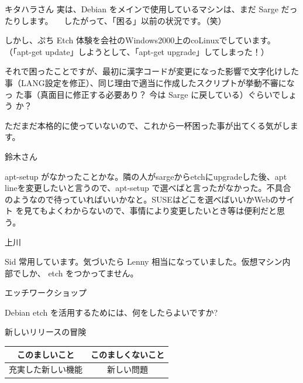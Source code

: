 \documentclass[cjk,dvipdfmx,12pt]{beamer}
\begin{document}
\begin{frame}{キタハラさん}
実は、Debian をメインで使用しているマシンは、まだ Sarge だったりします。
　したがって、「困る」以前の状況です。（笑）

しかし、ぷち Etch 体験を会社のWindows2000上のcoLinuxでしています。
（「apt-get update」しようとして、「apt-get upgrade」してしまった！）

それで困ったことですが、最初に漢字コードが変更になった影響で文字化けした
事（LANG設定を修正）、同じ理由で適当に作成したスクリプトが挙動不審になっ
た事（真面目に修正する必要あり？ 今は Sarge に戻している）ぐらいでしょう
か？

ただまだ本格的に使っていないので、これから一杯困った事が出てくる気がしま
す。

\end{frame}\begin{frame}{鈴木さん}

apt-setup がなかったことかな。隣の人がsargeからetchにupgradeした後、apt
lineを変更したいと言うので、apt-setup で選べばと言ったがなかった。不具合
のようなので待っていればいいかなと。SUSEはどこを選べばいいかWebのサイト
を見てもよくわからないので、事情により変更したいとき等は便利だと思う。

\end{frame}\begin{frame}{上川}

Sid 常用しています。気づいたら Lenny 相当になっていました。仮想マシン内
部でしか、 etch をつかってません。
\end{frame}

\begin{frame}{エッチワークショップ}

Debian etch を活用するためには、何をしたらよいですか?

\end{frame}


\begin{frame}{新しいリリースの冒険}
\begin{tabular}{|c|c|}
\hline
 このましいこと & このましくないこと \\
\hline
充実した新しい機能 & 新しい問題 \\
\hline
\end{tabular}
\end{frame}
\end{document}
